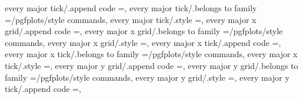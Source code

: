 {{{{{{{{every major tick/.append code                                      ={},                                                                           
every major tick/.belongs to family                                =/pgfplots/style commands,                                                                                                          
every major tick/.style                                            ={},                                                                                                                                
every major x grid/.append code                                    ={},                                                                         
every major x grid/.belongs to family                              =/pgfplots/style commands,                                                                                                          
every major x grid/.style                                          ={},                                                                                                                                
every major x tick/.append code                                    ={},                                                                         
every major x tick/.belongs to family                              =/pgfplots/style commands,                                                                                                          
every major x tick/.style                                          ={},                                                                                                                                
every major y grid/.append code                                    ={},                                                                         
every major y grid/.belongs to family                              =/pgfplots/style commands,                                                                                                          
every major y grid/.style                                          ={},                                                                                                                                
every major y tick/.append code                                    ={},                                                                         
}}}}}}}}
